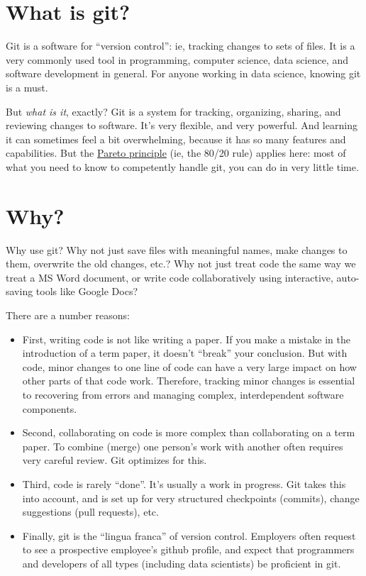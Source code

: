 \documentclass[
]{book}
\providecommand{\tightlist}{%
  \setlength{\itemsep}{0pt}\setlength{\parskip}{0pt}}
\begin{document}
\hypertarget{what-is-git}{%
\section*{What is git?}\label{what-is-git}}

Git is a software for ``version control'': ie, tracking changes to sets of files. It is a very commonly used tool in programming, computer science, data science, and software development in general. For anyone working in data science, knowing git is a must.

But \emph{what is it}, exactly? Git is a system for tracking, organizing, sharing, and reviewing changes to software. It's very flexible, and very powerful. And learning it can sometimes feel a bit overwhelming, because it has so many features and capabilities. But the \href{https://en.wikipedia.org/wiki/Pareto_principle}{Pareto principle} (ie, the 80/20 rule) applies here: most of what you need to know to competently handle git, you can do in very little time.

\hypertarget{why}{%
\section*{Why?}\label{why}}

Why use git? Why not just save files with meaningful names, make changes to them, overwrite the old changes, etc.? Why not just treat code the same way we treat a MS Word document, or write code collaboratively using interactive, auto-saving tools like Google Docs?

There are a number reasons:

\begin{itemize}
\tightlist
\item
  First, writing code is not like writing a paper. If you make a mistake in the introduction of a term paper, it doesn't ``break'' your conclusion. But with code, minor changes to one line of code can have a very large impact on how other parts of that code work. Therefore, tracking minor changes is essential to recovering from errors and managing complex, interdependent software components.\\
\item
  Second, collaborating on code is more complex than collaborating on a term paper. To combine (merge) one person's work with another often requires very careful review. Git optimizes for this.\\
\item
  Third, code is rarely ``done''. It's usually a work in progress. Git takes this into account, and is set up for very structured checkpoints (commits), change suggestions (pull requests), etc.
\item
  Finally, git is the ``lingua franca'' of version control. Employers often request to see a prospective employee's github profile, and expect that programmers and developers of all types (including data scientists) be proficient in git.
\end{itemize}
\end{document}
